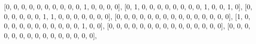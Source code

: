 \documentclass[
  letterpaper,
  DIV=11,
  numbers=noendperiod]{scrreprt}
\newenvironment{Shaded}{\begin{snugshade}}{\end{snugshade}}
\newcommand{\DecValTok}[1]{\textcolor[rgb]{0.68,0.00,0.00}{#1}}
\newcommand{\NormalTok}[1]{\textcolor[rgb]{0.00,0.23,0.31}{#1}}
\begin{document}
\begin{tcolorbox}
\begin{Shaded}
\begin{Highlighting}[]
\NormalTok{    [}\DecValTok{0}\NormalTok{, }\DecValTok{0}\NormalTok{, }\DecValTok{0}\NormalTok{, }\DecValTok{0}\NormalTok{, }\DecValTok{0}\NormalTok{, }\DecValTok{0}\NormalTok{, }\DecValTok{0}\NormalTok{, }\DecValTok{0}\NormalTok{, }\DecValTok{0}\NormalTok{, }\DecValTok{0}\NormalTok{, }\DecValTok{1}\NormalTok{, }\DecValTok{0}\NormalTok{, }\DecValTok{0}\NormalTok{, }\DecValTok{0}\NormalTok{, }\DecValTok{0}\NormalTok{],}
\NormalTok{    [}\DecValTok{0}\NormalTok{, }\DecValTok{1}\NormalTok{, }\DecValTok{0}\NormalTok{, }\DecValTok{0}\NormalTok{, }\DecValTok{0}\NormalTok{, }\DecValTok{0}\NormalTok{, }\DecValTok{0}\NormalTok{, }\DecValTok{0}\NormalTok{, }\DecValTok{0}\NormalTok{, }\DecValTok{0}\NormalTok{, }\DecValTok{1}\NormalTok{, }\DecValTok{0}\NormalTok{, }\DecValTok{0}\NormalTok{, }\DecValTok{1}\NormalTok{, }\DecValTok{0}\NormalTok{],}
\NormalTok{    [}\DecValTok{0}\NormalTok{, }\DecValTok{0}\NormalTok{, }\DecValTok{0}\NormalTok{, }\DecValTok{0}\NormalTok{, }\DecValTok{0}\NormalTok{, }\DecValTok{0}\NormalTok{, }\DecValTok{1}\NormalTok{, }\DecValTok{1}\NormalTok{, }\DecValTok{0}\NormalTok{, }\DecValTok{0}\NormalTok{, }\DecValTok{0}\NormalTok{, }\DecValTok{0}\NormalTok{, }\DecValTok{0}\NormalTok{, }\DecValTok{0}\NormalTok{, }\DecValTok{0}\NormalTok{],}
\NormalTok{    [}\DecValTok{0}\NormalTok{, }\DecValTok{0}\NormalTok{, }\DecValTok{0}\NormalTok{, }\DecValTok{0}\NormalTok{, }\DecValTok{0}\NormalTok{, }\DecValTok{0}\NormalTok{, }\DecValTok{0}\NormalTok{, }\DecValTok{0}\NormalTok{, }\DecValTok{0}\NormalTok{, }\DecValTok{0}\NormalTok{, }\DecValTok{0}\NormalTok{, }\DecValTok{0}\NormalTok{, }\DecValTok{0}\NormalTok{, }\DecValTok{0}\NormalTok{, }\DecValTok{0}\NormalTok{],}
\NormalTok{    [}\DecValTok{1}\NormalTok{, }\DecValTok{0}\NormalTok{, }\DecValTok{0}\NormalTok{, }\DecValTok{0}\NormalTok{, }\DecValTok{0}\NormalTok{, }\DecValTok{0}\NormalTok{, }\DecValTok{0}\NormalTok{, }\DecValTok{0}\NormalTok{, }\DecValTok{0}\NormalTok{, }\DecValTok{0}\NormalTok{, }\DecValTok{0}\NormalTok{, }\DecValTok{0}\NormalTok{, }\DecValTok{1}\NormalTok{, }\DecValTok{0}\NormalTok{, }\DecValTok{0}\NormalTok{],}
\NormalTok{    [}\DecValTok{0}\NormalTok{, }\DecValTok{0}\NormalTok{, }\DecValTok{0}\NormalTok{, }\DecValTok{0}\NormalTok{, }\DecValTok{0}\NormalTok{, }\DecValTok{0}\NormalTok{, }\DecValTok{0}\NormalTok{, }\DecValTok{0}\NormalTok{, }\DecValTok{0}\NormalTok{, }\DecValTok{0}\NormalTok{, }\DecValTok{0}\NormalTok{, }\DecValTok{0}\NormalTok{, }\DecValTok{0}\NormalTok{, }\DecValTok{0}\NormalTok{, }\DecValTok{0}\NormalTok{],}
\NormalTok{    [}\DecValTok{0}\NormalTok{, }\DecValTok{0}\NormalTok{, }\DecValTok{0}\NormalTok{, }\DecValTok{0}\NormalTok{, }\DecValTok{0}\NormalTok{, }\DecValTok{0}\NormalTok{, }\DecValTok{0}\NormalTok{, }\DecValTok{0}\NormalTok{, }\DecValTok{0}\NormalTok{, }\DecValTok{0}\NormalTok{, }\DecValTok{0}\NormalTok{, }\DecValTok{0}\NormalTok{, }\DecValTok{0}\NormalTok{, }\DecValTok{0}\NormalTok{, }\DecValTok{0}\NormalTok{],}

\end{Highlighting}
\end{Shaded}
\end{tcolorbox}
\end{document}

